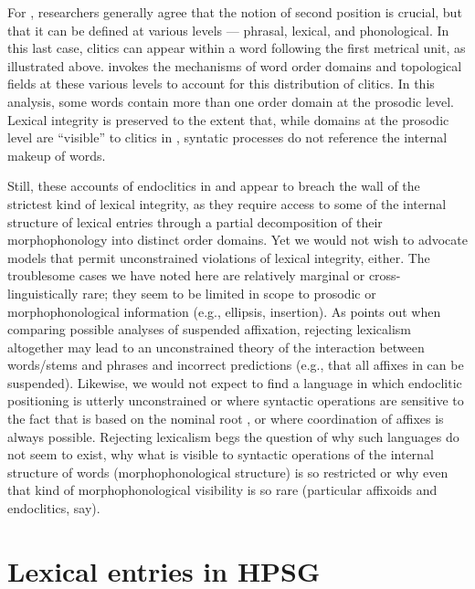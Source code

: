 \documentclass[output=paper
 	        ,biblatex
                ,babelshorthands
                ,newtxmath
                ,draftmode
                ,colorlinks, citecolor=brown
]{langscibook}
\begin{document}
For , researchers generally agree that the notion of second position is crucial, but that it
can be defined at various levels --- phrasal, lexical, and phonological. In this last case, clitics
can appear within a word following the first metrical unit, as illustrated above.
\citet{Dost2007} invokes the mechanisms of word order domains \citep{Reape1994} and topological fields \citep{Kathol2000a} at these various levels to account for this distribution of clitics. In this analysis, some words contain more than one order domain at the prosodic level. Lexical integrity is preserved to the extent that, while domains at the prosodic level are ``visible'' to clitics in , syntatic processes do not reference the internal makeup of words.

Still, these accounts of endoclitics in  and  appear to breach the wall of the strictest kind of lexical integrity, as they require access to some of the internal structure of lexical entries through a partial decomposition of their morphophonology into distinct order domains. Yet we would not wish to advocate models that permit unconstrained violations of lexical integrity, either. The troublesome cases we have noted here are relatively marginal or cross-linguistically rare; they seem to be limited in scope to prosodic or morphophonological information (e.g., ellipsis, insertion). As \citet{Broadwell2008} points out when comparing possible analyses of  suspended affixation, rejecting lexicalism altogether may lead to an unconstrained theory of the interaction between words/stems and phrases and incorrect predictions (e.g., that all affixes in  can be suspended). Likewise, we would not expect to find a language in which endoclitic positioning is utterly unconstrained or where syntactic operations are sensitive to the fact that  is based on the nominal root , or where coordination of affixes is always possible. Rejecting lexicalism begs the question of why such languages do not seem to exist, why what is visible to syntactic operations of the internal structure of words (morphophonological structure) is so restricted or why even that kind of morphophonological visibility is so rare (particular affixoids and endoclitics, say).


\section{Lexical entries in HPSG}
\end{document}
